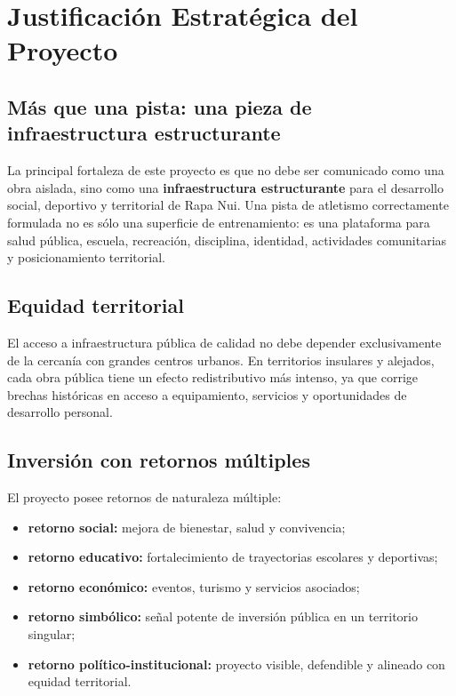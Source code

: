 \documentclass[12pt,letterpaper]{article}
\begin{document}
\section{Justificación Estratégica del Proyecto}

\subsection{Más que una pista: una pieza de infraestructura estructurante}

La principal fortaleza de este proyecto es que no debe ser comunicado como una obra aislada, sino como una \textbf{infraestructura estructurante} para el desarrollo social, deportivo y territorial de Rapa Nui. Una pista de atletismo correctamente formulada no es sólo una superficie de entrenamiento: es una plataforma para salud pública, escuela, recreación, disciplina, identidad, actividades comunitarias y posicionamiento territorial.

\subsection{Equidad territorial}

El acceso a infraestructura pública de calidad no debe depender exclusivamente de la cercanía con grandes centros urbanos. En territorios insulares y alejados, cada obra pública tiene un efecto redistributivo más intenso, ya que corrige brechas históricas en acceso a equipamiento, servicios y oportunidades de desarrollo personal.

\subsection{Inversión con retornos múltiples}

El proyecto posee retornos de naturaleza múltiple:

\begin{itemize}
    \item \textbf{retorno social:} mejora de bienestar, salud y convivencia;
    \item \textbf{retorno educativo:} fortalecimiento de trayectorias escolares y deportivas;
    \item \textbf{retorno económico:} eventos, turismo y servicios asociados;
    \item \textbf{retorno simbólico:} señal potente de inversión pública en un territorio singular;
    \item \textbf{retorno político-institucional:} proyecto visible, defendible y alineado con equidad territorial.
\end{itemize}
\end{document}
